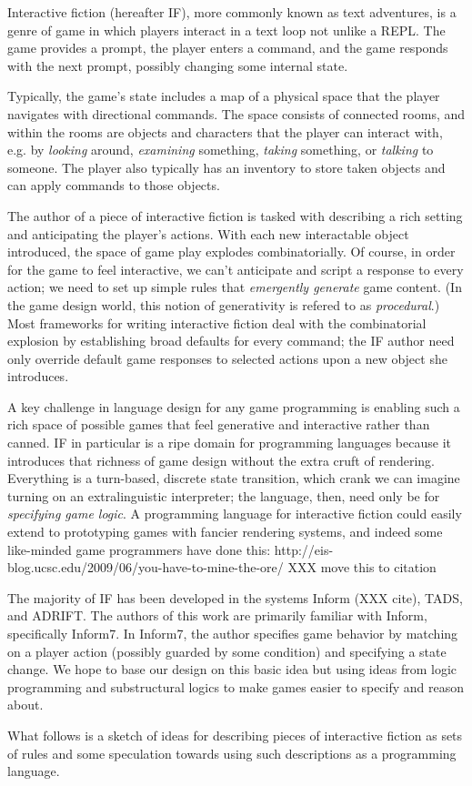 Interactive fiction (hereafter IF), more commonly known as text adventures,
is a genre of game in which players interact in a text loop not unlike a
REPL. The game provides a prompt, the player enters a command, and the game
responds with the next prompt, possibly changing some internal state.

Typically, the game's state includes a map of a physical space that the
player navigates with directional commands. The space consists of connected
rooms, and within the rooms are objects and characters that the player can
interact with, e.g. by {\em looking} around, {\em examining} something, 
{\em taking} something, or {\em talking} to someone. The player also
typically has an inventory to store taken objects and can apply commands to
those objects.

The author of a piece of interactive fiction is tasked with describing a
rich setting and anticipating the player's actions.  With each new
interactable object introduced, the space of game play explodes
combinatorially. Of course, in order for the game to feel interactive, we
can't anticipate and script a response to every action; we need to set up
simple rules that {\em emergently generate} game content.  (In the game
design world, this notion of generativity is refered to as {\em
procedural}.) Most frameworks for writing interactive fiction deal with the
combinatorial explosion by establishing broad defaults for every command;
the IF author need only override default game responses to selected actions
upon a new object she introduces.

A key challenge in language design for any game programming is enabling
such a rich space of possible games that feel generative and interactive
rather than canned.  IF in particular is a ripe domain for programming
languages because it introduces that richness of game design
without the extra cruft of rendering. Everything is a turn-based, discrete
state transition, which crank we can imagine turning on an extralinguistic
interpreter; the language, then, need only be for {\em specifying game
logic}. A programming language for interactive fiction could easily extend
to prototyping games with fancier rendering systems, and indeed some
like-minded game programmers have done this:
http://eis-blog.ucsc.edu/2009/06/you-have-to-mine-the-ore/
XXX move this to citation

The majority of IF has been developed in the systems Inform (XXX cite), TADS,
and ADRIFT. The authors of this work are primarily familiar with Inform,
specifically Inform7. In Inform7, the author specifies game behavior by
matching on a player action (possibly guarded by some condition) and
specifying a state change. We hope to base our design on this basic idea
but using ideas from logic programming and substructural logics to make
games easier to specify and reason about.

What follows is a sketch of ideas for describing pieces of interactive
fiction as sets of rules and some speculation towards using such
descriptions as a programming language.
